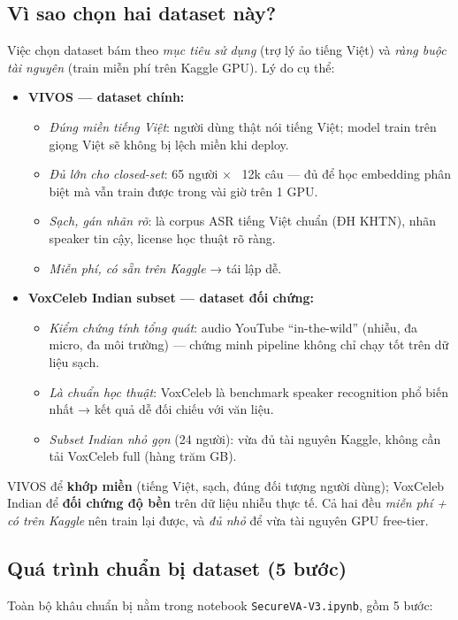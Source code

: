 \documentclass[12pt,a4paper]{article}
\begin{document}
\subsection{Vì sao chọn hai dataset này?}
Việc chọn dataset bám theo \emph{mục tiêu sử dụng} (trợ lý ảo tiếng Việt) và
\emph{ràng buộc tài nguyên} (train miễn phí trên Kaggle GPU). Lý do cụ thể:

\begin{itemize}
  \item \textbf{VIVOS --- dataset chính:}
  \begin{itemize}
    \item \emph{Đúng miền tiếng Việt}: người dùng thật nói tiếng Việt; model train
    trên giọng Việt sẽ không bị lệch miền khi deploy.
    \item \emph{Đủ lớn cho closed-set}: 65 người $\times$ ~12k câu --- đủ để học
    embedding phân biệt mà vẫn train được trong vài giờ trên 1 GPU.
    \item \emph{Sạch, gán nhãn rõ}: là corpus ASR tiếng Việt chuẩn (ĐH KHTN),
    nhãn speaker tin cậy, license học thuật rõ ràng.
    \item \emph{Miễn phí, có sẵn trên Kaggle} → tái lập dễ.
  \end{itemize}
  \item \textbf{VoxCeleb Indian subset --- dataset đối chứng:}
  \begin{itemize}
    \item \emph{Kiểm chứng tính tổng quát}: audio YouTube ``in-the-wild'' (nhiễu,
    đa micro, đa môi trường) --- chứng minh pipeline không chỉ chạy tốt trên dữ
    liệu sạch.
    \item \emph{Là chuẩn học thuật}: VoxCeleb là benchmark speaker recognition phổ
    biến nhất → kết quả dễ đối chiếu với văn liệu.
    \item \emph{Subset Indian nhỏ gọn} (24 người): vừa đủ tài nguyên Kaggle, không
    cần tải VoxCeleb full (hàng trăm GB).
  \end{itemize}
\end{itemize}

\begin{diembox}
VIVOS để \textbf{khớp miền} (tiếng Việt, sạch, đúng đối tượng người dùng);
VoxCeleb Indian để \textbf{đối chứng độ bền} trên dữ liệu nhiễu thực tế. Cả hai
đều \emph{miễn phí + có trên Kaggle} nên train lại được, và \emph{đủ nhỏ} để vừa
tài nguyên GPU free-tier.
\end{diembox}

\subsection{Quá trình chuẩn bị dataset (5 bước)}
Toàn bộ khâu chuẩn bị nằm trong notebook \texttt{SecureVA-V3.ipynb}, gồm 5 bước:
\end{document}
